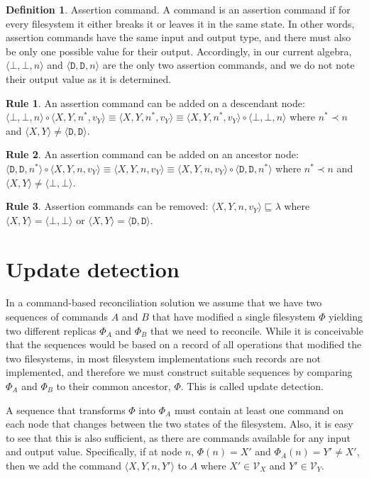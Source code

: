 \documentclass[12pt]{article}
\newcommand{\setvx}[1]{\mathcal{V}_{#1}} %
\newcommand{\empt}{\bot}
\newcommand{\FS}{\Phi} %
\newcommand{\nn}{n^*} %
\newcommand{\ccharb}{\empt}
\newcommand{\cchard}{\mathtt{D}}
\newcommand{\valvy}{v_Y} %
\newcommand{\caa}[2]{\langle{#1,#2}\rangle}
\newcommand{\caaa}[3]{\langle{#1,#2,#3}\rangle}
\newcommand{\caaaa}[4]{\langle{#1,#2,#3,#4}\rangle}
\newcommand{\cbb}{\caa{\ccharb}{\ccharb}}
\newcommand{\cbba}[1]{\caaa{\ccharb}{\ccharb}{#1}}
\newcommand{\cdd}{\caa{\cchard}{\cchard}}
\newcommand{\cdda}[1]{\caaa{\cchard}{\cchard}{#1}}
\newcommand{\cxy}{\caa{X}{Y}}
\newcommand{\cxyaa}[2]{\caaaa{X}{Y}{#1}{#2}}
\newcommand{\cxynv}{\caaaa{X}{Y}{n}{\valvy}}
\newcommand{\cxynnv}{\caaaa{X}{Y}{\nn}{\valvy}}
\newcommand{\cc}{\circ} %
\newcommand{\descendant}{\prec}
\newcommand{\eqext}{\sqsubseteq} %
\newcommand{\emptyseq}{\lambda} %
\theoremstyle{definition}
\newtheorem{mydef}{Definition}
\newtheorem{myax}{Rule}
\begin{document}
\begin{mydef}{Assertion command.}
A command is an assertion command if
for every filesystem it either breaks it or leaves it in the same state.
In other words, assertion commands have the same input and output type,
and there must also be only one possible value for their output.
Accordingly, in our current algebra, $\cbba{n}$ and $\cdda{n}$ are the only two assertion commands,
and we do not note their output value as it is determined.
\end{mydef}

\begin{myax}\label{ax_child_assert}
An assertion command can be added on a descendant node:
$\cbba{n}\cc\cxynnv \equiv \cxynnv \equiv \cxynnv\cc\cbba{n}$ 
where $\nn\descendant n$ and $\cxy\neq\cdd$.
\end{myax}

\begin{myax}\label{ax_parent_assert}
An assertion command can be added on an ancestor node:
$\cdda{\nn}\cc\cxynv \equiv \cxynv \equiv \cxynv\cc\cdda{\nn}$ 
where $\nn\descendant n$ and $\cxy\neq\cbb$.
\end{myax}

\begin{myax}\label{ax_assert}
Assertion commands can be removed:
$\cxynv \eqext \emptyseq$ where $\cxy=\cbb$ or $\cxy=\cdd$.
\end{myax}



\section{Update detection}

In a command-based reconciliation solution we assume that we have two sequences of commands
$A$ and $B$ that have modified a single filesystem $\FS$ yielding two different replicas $\FS_A$ and $\FS_B$ that we
need to reconcile. While it is conceivable that the sequences would be based on a record of
all operations that modified the two filesystems, in most filesystem implementations
such records are not implemented, and therefore we must construct suitable sequences
by comparing $\FS_A$ and $\FS_B$ to their common ancestor, $\FS$. This is called update detection.

A sequence that transforms $\FS$ into $\FS_A$ must contain at least one command on each node
that changes between the two states of the filesystem. Also, it is easy to see that this is also
sufficient, as there are commands available for any input and output value. 
Specifically, if at node $n$, $\FS(n)=X'$ and $\FS_A(n)=Y'\neq X'$, then we add the command $\cxyaa{n}{Y'}$ to $A$
where $X'\in\setvx{X}$ and $Y'\in\setvx{Y}$.
\end{document}
